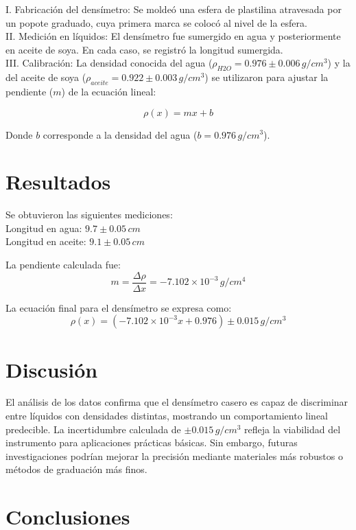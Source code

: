 \documentclass[article,12pt]{elsarticle}
\begin{document}
\noindent I. Fabricación del densímetro: Se moldeó una esfera de plastilina atravesada por un popote graduado, cuya primera marca se colocó al nivel de la esfera. \\
II. Medición en líquidos: El densímetro fue sumergido en agua y posteriormente en aceite de soya. En cada caso, se registró la longitud sumergida. \\
III. Calibración: La densidad conocida del agua (\(\rho_{H2O} = 0.976 \pm 0.006 \, g/cm^3\)) y la del aceite de soya (\(\rho_{aceite} = 0.922 \pm 0.003 \, g/cm^3\)) se utilizaron para ajustar la pendiente (\(m\)) de la ecuación lineal:

\[
\rho(x) = m x + b
\]

Donde \(b\) corresponde a la densidad del agua (\(b = 0.976 \, g/cm^3\)).
\section{Resultados} 
Se obtuvieron las siguientes mediciones:  \\
Longitud en agua: \(9.7 \pm 0.05 \, cm\)  \\
Longitud en aceite: \(9.1 \pm 0.05 \, cm\)  

La pendiente calculada fue:  
\[
m = \frac{\Delta \rho}{\Delta x} = -7.102 \times 10^{-3} \, g/cm^4
\]  

La ecuación final para el densímetro se expresa como:  
\[
\rho(x) = (-7.102 \times 10^{-3} x + 0.976) \pm 0.015 \, g/cm^3
\]

\section{Discusión}
El análisis de los datos confirma que el densímetro casero es capaz de discriminar entre líquidos con densidades distintas, mostrando un comportamiento lineal predecible. La incertidumbre calculada de \(\pm 0.015 \, g/cm^3\) refleja la viabilidad del instrumento para aplicaciones prácticas básicas. Sin embargo, futuras investigaciones podrían mejorar la precisión mediante materiales más robustos o métodos de graduación más finos.


\section{Conclusiones}
\end{document}

